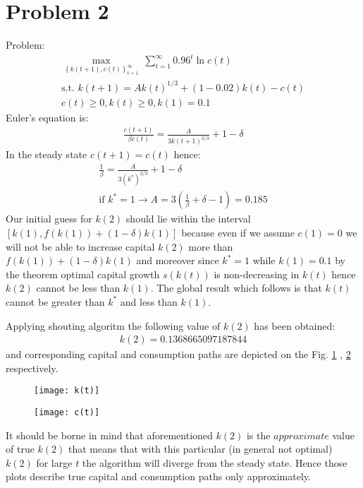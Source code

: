 \documentclass[a4paper]{article}
\begin{document}
\section*{Problem 2}
Problem:
\begin{align*}
\underset{\left\{k(t+1), c(t)\right\}_{t=1}^{\infty}}{\max}\ \sum_{t=1}^{\infty} 0.96^t \ln c(t)\\
\text{s.t.\ } k(t+1) = Ak(t)^{1/3} + (1-0.02)k(t) - c(t)\\
c(t) \ge 0, k(t) \ge 0, k(1) = 0.1
\end{align*}
Euler's equation is:
\begin{align*}
\frac{c(t+1)}{\beta c(t)} = \frac{A}{3k(t+1)^{2/3}} + 1 - \delta
\end{align*}
In the steady state $c(t+1) = c(t)$ hence:
\begin{align*}
\frac{1}{\beta} = \frac{A}{3(k^*)^{2/3}} + 1 - \delta\\
\text{if } k^* = 1 \to A = 3(\frac{1}{\beta} + \delta - 1) = 0.185
\end{align*}
Our initial guess for $k(2)$ should lie within the interval $ [k(1), f(k(1)) + (1 - \delta)k(1)]$ because even if we assume $c(1) = 0$ we will not be able to increase capital $k(2)$ more than $f(k(1)) + (1 - \delta)k(1)$ and moreover since $k^* = 1$ while $k(1) = 0.1$ by the theorem optimal capital growth $s(k(t))$ is non-decreasing in $k(t)$ hence $k(2)$ cannot be less than $k(1)$. The global result which follows is that $k(t)$ cannot be greater than $k^*$ and less than $k(1)$.



Applying shouting algoritm the following value of $k(2)$ has been obtained:
\begin{align*}
k(2) = 0.1368665097187844
\end{align*}
and corresponding capital and consumption paths are depicted on the Fig. \ref{fig1} , \ref{fig2} respectively.
\begin{figure}[H]
	\centering
	\texttt{[image: k(t)]}
	\caption{}\label{fig1}
\end{figure}
\begin{figure}[h]
	\centering
	\texttt{[image: c(t)]}
	\caption{}\label{fig2}
\end{figure}




It should be borne in mind that aforementioned $k(2)$ is the $\textit{approximate}$ value of true $k(2)$ that means that with this particular (in general not optimal) $k(2)$ for large $t$ the algorithm will diverge from the steady state. Hence those plots describe true capital and consumption paths only approximately. 
\end{document}
